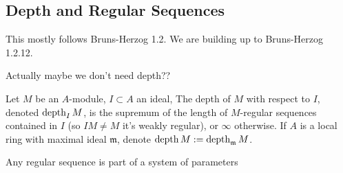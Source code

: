 \subsection{Depth and Regular Sequences}

This mostly follows Bruns-Herzog 1.2.
We are building up to Bruns-Herzog 1.2.12.

Actually maybe we don't need depth??

\begin{definition}
  \label{def:depth}
	Let $M$ be an $A$-module, $I \subset A$ an ideal, The depth of $M$ with respect to $I$, denoted $\operatorname{depth}_I M$, is the supremum of the length of $M$-regular sequences contained in $I$ (so $IM \neq M$ it's weakly regular), or $\infty$ otherwise.
	If $A$ is a local ring with maximal ideal $\mathfrak{m}$, denote $\operatorname{depth} M := \operatorname{depth}_\mathfrak{m}M$.
\end{definition}

\begin{theorem}[BH 1.2.12]
  \label{thm:reg_seq_part_of_sys_param}
  Any regular sequence is part of a system of parameters
\end{theorem}

